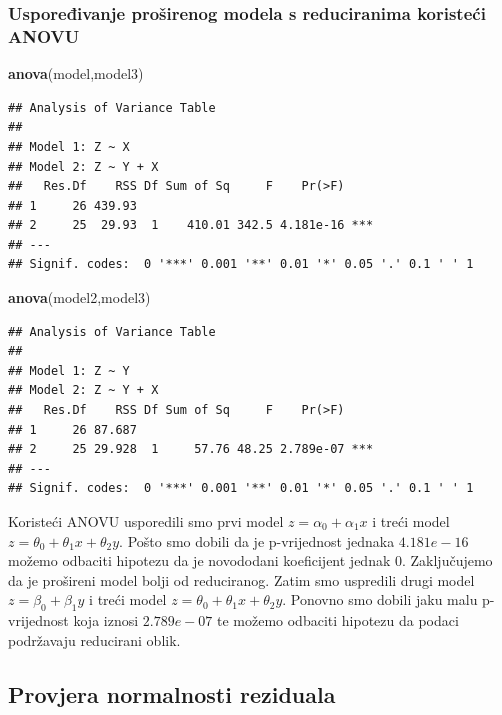 \documentclass[]{article}
\newenvironment{Shaded}{\begin{snugshade}}{\end{snugshade}}
\newcommand{\KeywordTok}[1]{\textcolor[rgb]{0.13,0.29,0.53}{\textbf{{#1}}}}
\newcommand{\NormalTok}[1]{{#1}}
\begin{document}
\subsubsection{Uspoređivanje proširenog modela s reduciranima koristeći
ANOVU}\label{usporeivanje-prosirenog-modela-s-reduciranima-koristeci-anovu}

\begin{Shaded}
\begin{Highlighting}[]
\KeywordTok{anova}\NormalTok{(model,model3)}
\end{Highlighting}
\end{Shaded}

\begin{verbatim}
## Analysis of Variance Table
## 
## Model 1: Z ~ X
## Model 2: Z ~ Y + X
##   Res.Df    RSS Df Sum of Sq     F    Pr(>F)    
## 1     26 439.93                                 
## 2     25  29.93  1    410.01 342.5 4.181e-16 ***
## ---
## Signif. codes:  0 '***' 0.001 '**' 0.01 '*' 0.05 '.' 0.1 ' ' 1
\end{verbatim}

\begin{Shaded}
\begin{Highlighting}[]
\KeywordTok{anova}\NormalTok{(model2,model3)}
\end{Highlighting}
\end{Shaded}

\begin{verbatim}
## Analysis of Variance Table
## 
## Model 1: Z ~ Y
## Model 2: Z ~ Y + X
##   Res.Df    RSS Df Sum of Sq     F    Pr(>F)    
## 1     26 87.687                                 
## 2     25 29.928  1     57.76 48.25 2.789e-07 ***
## ---
## Signif. codes:  0 '***' 0.001 '**' 0.01 '*' 0.05 '.' 0.1 ' ' 1
\end{verbatim}

Koristeći ANOVU usporedili smo prvi model \(z = \alpha_0 + \alpha_1 x \)
i treći model \(z = \theta_0 + \theta_1 x + \theta_2 y \). Pošto smo
dobili da je p-vrijednost jednaka \(4.181e-16\) možemo odbaciti hipotezu
da je novododani koeficijent jednak 0. Zaključujemo da je prošireni
model bolji od reduciranog. Zatim smo uspredili drugi model
\(z = \beta_0 + \beta_1 y \) i treći model
\(z = \theta_0 + \theta_1 x + \theta_2 y \). Ponovno smo dobili jaku
malu p-vrijednost koja iznosi \(2.789e-07\) te možemo odbaciti hipotezu
da podaci podržavaju reducirani oblik.

\subsection{Provjera normalnosti
reziduala}\label{provjera-normalnosti-reziduala-2}
\end{document}
